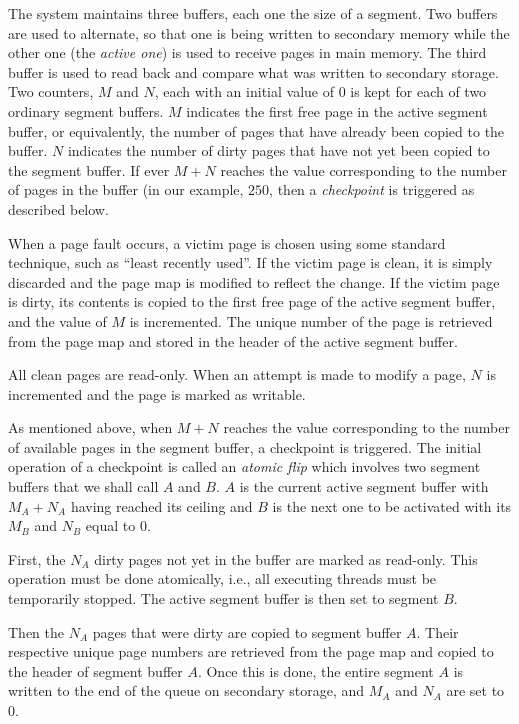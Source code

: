 The system maintains three buffers, each one the size of a segment.
Two buffers are used to alternate, so that one is being written to
secondary memory while the other one (the \emph{active one}) is used
to receive pages in main memory.  The third buffer is used to read
back and compare what was written to secondary storage.  Two counters,
$M$ and $N$, each with an initial value of $0$ is kept for each of two
ordinary segment buffers.  $M$ indicates the first free page in the
active segment buffer, or equivalently, the number of pages that have
already been copied to the buffer.  $N$ indicates the number of dirty
pages that have not yet been copied to the segment buffer.  If ever
$M+N$ reaches the value corresponding to the number of pages in the
buffer (in our example, $250$, then a \emph{checkpoint} is triggered
as described below.

When a page fault occurs, a victim page is chosen using some standard
technique, such as ``least recently used''.  If the victim page is
clean, it is simply discarded and the page map is modified to
reflect the change.  If the victim page is dirty, its contents is
copied to the first free page of the active segment buffer, and the
value of $M$ is incremented.  The unique number of the page is
retrieved from the page map and stored in the header of the active
segment buffer.

All clean pages are read-only.  When an attempt is made to modify a
page, $N$ is incremented and the page is marked as writable.

As mentioned above, when $M+N$ reaches the value corresponding to the
number of available pages in the segment buffer, a checkpoint is
triggered.  The initial operation of a checkpoint is called an
\emph{atomic flip} which involves two segment buffers that we shall
call $A$ and $B$.  $A$ is the current active segment buffer with $M_A+N_A$
having reached its ceiling and $B$ is the next one to be activated
with its $M_B$ and $N_B$ equal to $0$.

First, the $N_A$ dirty pages not yet in the buffer are
marked as read-only.  This operation must be done atomically, i.e.,
all executing threads must be temporarily stopped.  The active segment
buffer is then set to segment $B$.

Then the $N_A$ pages that were dirty are copied to segment buffer $A$.
Their respective unique page numbers are retrieved from the page map
and copied to the header of segment buffer $A$.  Once this is done,
the entire segment $A$ is written to the end of the queue on secondary
storage, and $M_A$ and $N_A$ are set to $0$.

